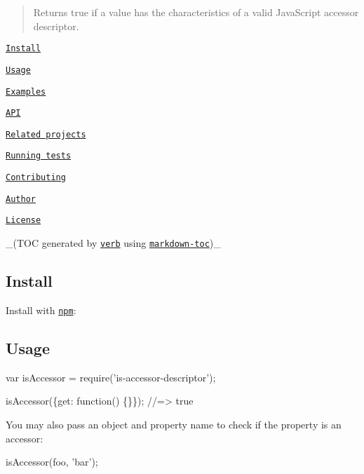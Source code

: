 \begin{quote}
Returns true if a value has the characteristics of a valid Java\+Script accessor descriptor. \end{quote}



\begin{DoxyItemize}
\item \href{#install}{\tt Install}
\item \href{#usage}{\tt Usage}
\item \href{#examples}{\tt Examples}
\item \href{#api}{\tt A\+PI}
\item \href{#related-projects}{\tt Related projects}
\item \href{#running-tests}{\tt Running tests}
\item \href{#contributing}{\tt Contributing}
\item \href{#author}{\tt Author}
\item \href{#license}{\tt License}
\end{DoxyItemize}

\+\_\+(T\+OC generated by \href{https://github.com/verbose/verb}{\tt verb} using \href{https://github.com/jonschlinkert/markdown-toc}{\tt markdown-\/toc})\+\_\+

\subsection*{Install}

Install with \href{https://www.npmjs.com/}{\tt npm}\+:




\subsection*{Usage}


\begin{DoxyCode}
var isAccessor = require('is-accessor-descriptor');

isAccessor(\{get: function() \{\}\});
//=> true
\end{DoxyCode}


You may also pass an object and property name to check if the property is an accessor\+:


\begin{DoxyCode}
isAccessor(foo, 'bar');
\end{DoxyCode}


